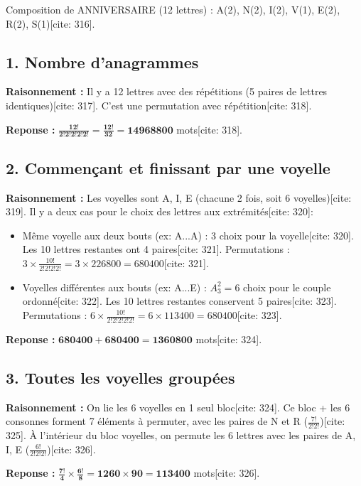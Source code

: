 \documentclass[11pt,a4paper]{article}
\begin{document}
Composition de ANNIVERSAIRE (12 lettres) : A(2), N(2), I(2), V(1), E(2), R(2), S(1)[cite: 316].

\subsection*{1. Nombre d'anagrammes}

\textbf{Raisonnement :} Il y a 12 lettres avec des répétitions (5 paires de lettres identiques)[cite: 317]. C'est une permutation avec répétition[cite: 318].

\textbf{Reponse :} $\mathbf{\frac{12!}{2!2!2!2!2!} = \frac{12!}{32} = 14968800}$ mots[cite: 318].

\subsection*{2. Commençant et finissant par une voyelle}

\textbf{Raisonnement :} Les voyelles sont A, I, E (chacune 2 fois, soit 6 voyelles)[cite: 319]. Il y a deux cas pour le choix des lettres aux extrémités[cite: 320]:
\begin{itemize}
    \item Même voyelle aux deux bouts (ex: A...A) : 3 choix pour la voyelle[cite: 320]. Les 10 lettres restantes ont 4 paires[cite: 321]. Permutations : $3 \times \frac{10!}{2!2!2!2!} = 3 \times 226800 = 680400$[cite: 321].
    \item Voyelles différentes aux bouts (ex: A...E) : $A_3^2 = 6$ choix pour le couple ordonné[cite: 322]. Les 10 lettres restantes conservent 5 paires[cite: 323]. Permutations : $6 \times \frac{10!}{2!2!2!2!2!} = 6 \times 113400 = 680400$[cite: 323].
\end{itemize}

\textbf{Reponse :} $\mathbf{680400 + 680400 = 1360800}$ mots[cite: 324].

\subsection*{3. Toutes les voyelles groupées}

\textbf{Raisonnement :} On lie les 6 voyelles en 1 seul bloc[cite: 324]. Ce bloc + les 6 consonnes forment 7 éléments à permuter, avec les paires de N et R ($\frac{7!}{2!2!}$)[cite: 325]. À l'intérieur du bloc voyelles, on permute les 6 lettres avec les paires de A, I, E ($\frac{6!}{2!2!2!}$)[cite: 326].

\textbf{Reponse :} $\mathbf{\frac{7!}{4} \times \frac{6!}{8} = 1260 \times 90 = 113400}$ mots[cite: 326].
\end{document}

